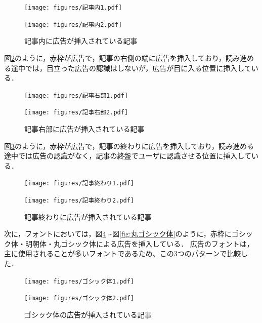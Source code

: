\documentclass[12pt,a4j,titlepage]{ltjsarticle}
\begin{document}
\begin{figure}[H]
  \begin{minipage}[b]{0.50\linewidth}
    \centering
    \texttt{[image: figures/記事内1.pdf]}
  \end{minipage}
  \begin{minipage}[b]{0.50\linewidth}
    \centering
    \texttt{[image: figures/記事内2.pdf]}
  \end{minipage}
   \caption{記事内に広告が挿入されている記事}
    \label{fig:記事内}
\end{figure}

図\ref{fig:記事右部}のように，赤枠が広告で，記事の右側の端に広告を挿入しており，読み進める途中では，目立った広告の認識はしないが，広告が目に入る位置に挿入している．

\begin{figure}[H]
  \begin{minipage}[b]{0.50\linewidth}
    \centering
    \texttt{[image: figures/記事右部1.pdf]}
  \end{minipage}
  \begin{minipage}[b]{0.50\linewidth}
    \centering
    \texttt{[image: figures/記事右部2.pdf]}
  \end{minipage}
   \caption{記事右部に広告が挿入されている記事}
    \label{fig:記事右部}
\end{figure}

図\ref{fig:記事終わり}のように，赤枠が広告で，記事の終わりに広告を挿入しており，読み進める途中では広告の認識がなく，記事の終盤でユーザに認識させる位置に挿入している．

\begin{figure}[H]
  \begin{minipage}[b]{0.50\linewidth}
    \centering
    \texttt{[image: figures/記事終わり1.pdf]}
  \end{minipage}
  \begin{minipage}[b]{0.50\linewidth}
    \centering
    \texttt{[image: figures/記事終わり2.pdf]}
  \end{minipage}
   \caption{記事終わりに広告が挿入されている記事}
    \label{fig:記事終わり}
\end{figure}

次に，フォントにおいては，図\ref{fig:ゴシック体} \textasciitilde 図\ref{fig:丸ゴシック体}のように，赤枠にゴシック体・明朝体・丸ゴシック体による広告を挿入している．
広告のフォントは，主に使用されることが多いフォントであるため、この3つのパターンで比較した．

\begin{figure}[H]
  \begin{minipage}[b]{0.50\linewidth}
    \centering
    \texttt{[image: figures/ゴシック体1.pdf]}
  \end{minipage}
  \begin{minipage}[b]{0.50\linewidth}
    \centering
    \texttt{[image: figures/ゴシック体2.pdf]}
  \end{minipage}
   \caption{ゴシック体の広告が挿入されている記事}
    \label{fig:ゴシック体}
\end{figure}
\end{document}
